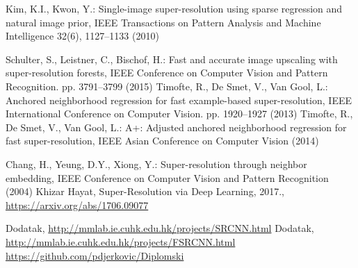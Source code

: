 \documentclass[12pt]{report}
\numberwithin{equation}{section}
\begin{document}
\begin{thebibliography}{10}
 Kim, K.I., Kwon, Y.: Single-image super-resolution using sparse regression and natural image prior, IEEE Transactions on Pattern Analysis and Machine Intelligence 32(6), 1127–1133 (2010)

 Schulter, S., Leistner, C., Bischof, H.: Fast and accurate image upscaling with super-resolution forests, IEEE Conference on Computer Vision and Pattern Recognition. pp. 3791–3799 (2015)
 Timofte, R., De Smet, V., Van Gool, L.: Anchored neighborhood regression for fast example-based super-resolution, IEEE International Conference on Computer Vision. pp. 1920–1927 (2013)
 Timofte, R., De Smet, V., Van Gool, L.: A+: Adjusted anchored neighborhood regression for fast super-resolution, IEEE Asian Conference on Computer Vision (2014)

 Chang, H., Yeung, D.Y., Xiong, Y.: Super-resolution through neighbor embedding, IEEE Conference on Computer Vision and Pattern Recognition (2004)
 Khizar Hayat, Super-Resolution via Deep Learning, 2017., \url{https://arxiv.org/abs/1706.09077}

 Dodatak, \url{http://mmlab.ie.cuhk.edu.hk/projects/SRCNN.html}
 Dodatak, \url{http://mmlab.ie.cuhk.edu.hk/projects/FSRCNN.html}
 \url{https://github.com/pdjerkovic/Diplomski}






\end{thebibliography}
\end{document}
